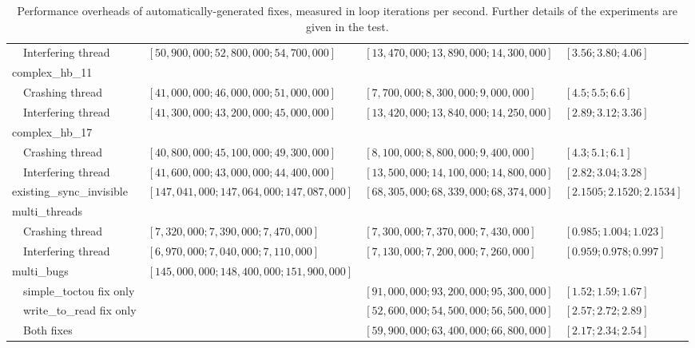 \begin{sidewaystable}
\begin{tabular}{lllll}
    & \multicolumn{1}{l}{Interfering thread} & $[50,\!900,\!000; 52,\!800,\!000; 54,\!700,\!000]$  &  $[13,\!470,\!000; 13,\!890,\!000; 14,\!300,\!000]$  &  $[3.56; 3.80; 4.06]$ \\
    \multicolumn{2}{l}{complex\_hb\_11               } \\
    & \multicolumn{1}{l}{Crashing thread} & $[41,\!000,\!000; 46,\!000,\!000; 51,\!000,\!000]$  &  $[7,\!700,\!000; 8,\!300,\!000; 9,\!000,\!000]$  &  $[4.5; 5.5; 6.6]$ \\
    & \multicolumn{1}{l}{Interfering thread} & $[41,\!300,\!000; 43,\!200,\!000; 45,\!000,\!000]$  &  $[13,\!420,\!000; 13,\!840,\!000; 14,\!250,\!000]$  &  $[2.89; 3.12; 3.36]$ \\
    \multicolumn{2}{l}{complex\_hb\_17               } \\
    & \multicolumn{1}{l}{Crashing thread} & $[40,\!800,\!000; 45,\!100,\!000; 49,\!300,\!000]$  &  $[8,\!100,\!000; 8,\!800,\!000; 9,\!400,\!000]$  &  $[4.3; 5.1; 6.1]$ \\
    & \multicolumn{1}{l}{Interfering thread} & $[41,\!600,\!000; 43,\!000,\!000; 44,\!400,\!000]$  &  $[13,\!500,\!000; 14,\!100,\!000; 14,\!800,\!000]$  &  $[2.82; 3.04; 3.28]$ \\
    \multicolumn{2}{l}{existing\_sync\_invisible     }  & $[147,\!041,\!000; 147,\!064,\!000; 147,\!087,\!000]$  &  $[68,\!305,\!000; 68,\!339,\!000; 68,\!374,\!000]$  &  $[2.1505; 2.1520; 2.1534]$ \\
    \multicolumn{2}{l}{multi\_threads                } \\
    & \multicolumn{1}{l}{Crashing thread} & $[7,\!320,\!000; 7,\!390,\!000; 7,\!470,\!000]$  &  $[7,\!300,\!000; 7,\!370,\!000; 7,\!430,\!000]$  &  $[0.985; 1.004; 1.023]$ \\
    & \multicolumn{1}{l}{Interfering thread} & $[6,\!970,\!000; 7,\!040,\!000; 7,\!110,\!000]$  &  $[7,\!130,\!000; 7,\!200,\!000; 7,\!260,\!000]$  &  $[0.959; 0.978; 0.997]$ \\
    \multicolumn{2}{l}{multi\_bugs} & $[145,\!000,\!000; 148,\!400,\!000; 151,\!900,\!000]$ \\
    & simple\_toctou fix only & & $[91,\!000,\!000; 93,\!200,\!000; 95,\!300,\!000]$  &  $[1.52; 1.59; 1.67]$ \\
    & write\_to\_read fix only & & $[52,\!600,\!000; 54,\!500,\!000; 56,\!500,\!000]$  &  $[2.57; 2.72; 2.89]$\\
    & Both fixes & &  $[59,\!900,\!000; 63,\!400,\!000; 66,\!800,\!000]$  &  $[2.17; 2.34; 2.54]$ \\
  \end{tabular}
  \caption{Performance overheads of automatically-generated fixes,
    measured in loop iterations per second.  Further details of the
    experiments are given in the test.}
  \label{table:eval:fix_overheads}
\end{sidewaystable}

